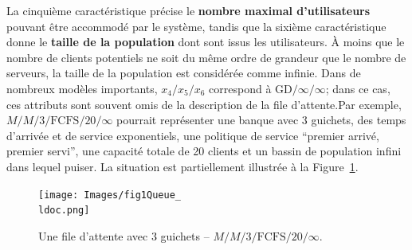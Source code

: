 \newl
La cinquième caractéristique précise le \textbf{nombre maximal d’utilisateurs} pouvant être accommodé par le système, tandis que la sixième caractéristique  donne le \textbf{taille de la population} dont sont issus les utilisateurs. À moins que le nombre de clients potentiels ne soit du même ordre de grandeur que le nombre de serveurs, la taille de la population est considérée comme infinie. \newl Dans de nombreux modèles importants, $x_4/x_5/x_6$ correspond à $\textrm{GD}/\infty/\infty$; dans ce cas, ces attributs sont souvent omis de la description de la file d'attente.\newl  Par exemple, $M/M/3/\textrm{FCFS}/20/\infty$ pourrait représenter une banque avec 3 guichets, des temps d'arrivée et de service exponentiels, une politique de service ``premier arrivé, premier servi'', une capacité totale de 20 clients et un bassin de population infini dans lequel puiser. La situation est partiellement illustrée à la Figure~\ref{fig:1}.
\begin{figure}[t]
	\centering
		\texttt{[image: Images/fig1Queue\_\\ldoc.png]}
	\caption{\small Une file d'attente avec $3$ guichets  -- $M/M/3/\textrm{FCFS}/20/\infty$.}
	\label{fig:1}
\end{figure}
